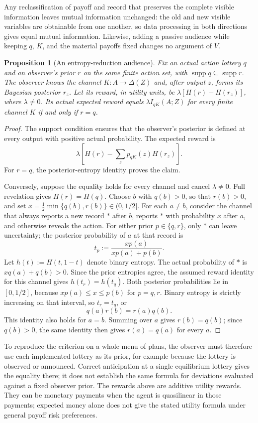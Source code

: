 \documentclass[11pt,a4paper]{article}
\newtheorem{proposition}[theorem]{Proposition}
\theoremstyle{definition}
\newcommand{\D}{\Delta}
\newcommand{\I}{I}
\newcommand{\Sh}{H}
\newcommand{\supp}{\operatorname{supp}}
\newcommand{\1}{\mathbf 1}
\begin{document}
Any reclassification of payoff and record that preserves the complete
visible information leaves mutual information unchanged: the old and new
visible variables are obtainable from one another, so data processing in
both directions gives equal mutual information.  Likewise, adding a passive
audience while keeping $q$, $K$, and the material payoffs fixed changes no
argument of $V$.

\begin{proposition}[An entropy-reduction audience]\label{prop:audience}
Fix an actual action lottery $q$ and an observer's prior $r$ on the same
finite action set, with $\supp q\subseteq\supp r$.  The observer knows
the channel $K:A\to\D(Z)$ and, after output $z$, forms its Bayesian
posterior $r_z$.  Let its reward, in utility units, be
$\lambda[\Sh(r)-\Sh(r_z)]$, where $\lambda\ne0$.
Its actual expected reward equals $\lambda\I_{qK}(A;Z)$ for every finite
channel $K$ if and only if $r=q$.
\end{proposition}

\begin{proof}
The support condition ensures that the observer's posterior is defined
at every output with positive actual probability.  The expected reward is
\[
 \lambda\left[\Sh(r)-\sum_zp_{qK}(z)\Sh(r_z)\right].
\]
For $r=q$, the posterior-entropy identity proves the claim.

Conversely, suppose the equality holds for every channel and cancel
$\lambda\ne0$.  Full revelation gives $\Sh(r)=\Sh(q)$.
Choose $b$ with $q(b)>0$, so that $r(b)>0$, and set
$x=\tfrac12\min\{q(b),r(b)\}\in(0,1/2]$.
For each $a\ne b$, consider the channel that always reports a new record
$\ast$ after $b$, reports $\ast$ with probability $x$ after $a$, and
otherwise reveals the action.
For either prior $p\in\{q,r\}$, only $\ast$ can leave uncertainty; the
posterior probability of $a$ at that record is
\[
 t_p:=\frac{xp(a)}{xp(a)+p(b)}.
\]
Let $h(t):=\Sh(t,1-t)$ denote binary entropy.  The actual probability of
$\ast$ is $xq(a)+q(b)>0$.  Since the prior entropies agree, the assumed
reward identity for this channel gives $h(t_r)=h(t_q)$.
Both posterior probabilities lie in $[0,1/2]$, because
$xp(a)\le x\le p(b)$ for $p=q,r$.  Binary entropy is strictly increasing
on that interval, so $t_r=t_q$, or
\[
 q(a)r(b)=r(a)q(b).
\]
This identity also holds for $a=b$.  Summing over $a$ gives $r(b)=q(b)$;
since $q(b)>0$, the same identity then gives $r(a)=q(a)$ for every $a$.
\end{proof}

To reproduce the criterion on a whole menu of plans, the observer must
therefore use each implemented lottery as its prior, for example because
the lottery is observed or announced.  Correct anticipation at a single
equilibrium lottery gives the equality there; it does not establish the
same formula for deviations evaluated against a fixed observer prior.
The rewards above are additive utility rewards.  They can be monetary
payments when the agent is quasilinear in those payments; expected money
alone does not give the stated utility formula under general payoff risk
preferences.
\end{document}
